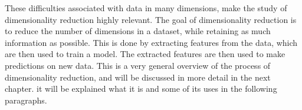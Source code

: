 These difficulties associated with data in many dimensions, make the study of dimensionality reduction highly relevant. The goal of dimensionality reduction is to reduce the number of dimensions in a dataset, while retaining as much information as possible. This is done by extracting features from the data, which are then used to train a model. The extracted features are then used to make predictions on new data. This is a very general overview of the process of dimensionality reduction, and will be discussed in more detail in the next chapter.
it will be explained what it is and some of its uses in the following paragraphs.









